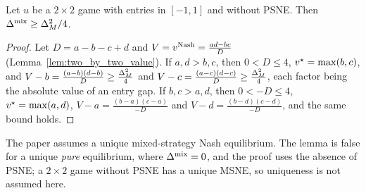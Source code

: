 \begin{lemma}[Lemma 10]
  \label{lem:delta_comparison}
  \leanok
  Let $u$ be a $2 \times 2$ game with entries in $[-1, 1]$ and without PSNE. Then
  $\Delta^{\mathrm{mix}} \ge \Delta_{M}^2/4$.
\end{lemma}

\begin{proof}
  \leanok
  Let $D = a - b - c + d$ and $V = v^{\mathrm{Nash}} = \frac{ad - bc}{D}$ (Lemma~\ref{lem:two_by_two_value}).
  If $a, d > b, c$, then $0 < D \le 4$, $v^\star = \max(b, c)$, and
  $V - b = \frac{(a - b)(d - b)}{D} \ge \frac{\Delta_{M}^2}{4}$ and
  $V - c = \frac{(a - c)(d - c)}{D} \ge \frac{\Delta_{M}^2}{4}$, each factor being the absolute value of
  an entry gap. If $b, c > a, d$, then $0 < -D \le 4$, $v^\star = \max(a, d)$,
  $V - a = \frac{(b - a)(c - a)}{-D}$ and $V - d = \frac{(b - d)(c - d)}{-D}$, and the same bound
  holds.
\end{proof}

\begin{remark}
  \label{rem:delta_comparison_statement}
  The paper assumes a unique mixed-strategy Nash equilibrium. The lemma is false for a unique
  \emph{pure} equilibrium, where $\Delta^{\mathrm{mix}} = 0$, and the proof uses the absence of PSNE; a $2 \times 2$
  game without PSNE has a unique MSNE, so uniqueness is not assumed here.
\end{remark}
